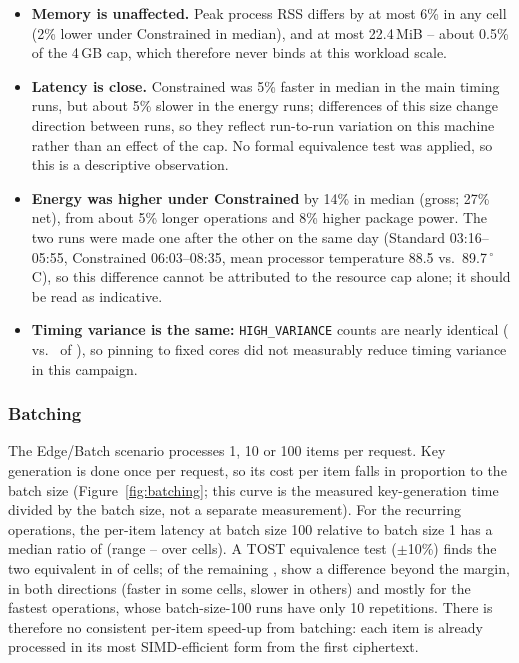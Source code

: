 \begin{itemize}[leftmargin=*, itemsep=2pt]
  \item \textbf{Memory is unaffected.} Peak process RSS differs by at most 6\% in any cell (2\% lower under Constrained in median), and at most 22.4\,MiB -- about 0.5\% of the 4\,GB cap, which therefore never binds at this workload scale.
  \item \textbf{Latency is close.} Constrained was 5\% faster in median in the main timing runs, but about 5\% slower in the energy runs; differences of this size change direction between runs, so they reflect run-to-run variation on this machine rather than an effect of the cap. No formal equivalence test was applied, so this is a descriptive observation.
  \item \textbf{Energy was higher under Constrained} by 14\% in median (gross; 27\% net), from about 5\% longer operations and 8\% higher package power. The two runs were made one after the other on the same day (Standard 03:16--05:55, Constrained 06:03--08:35, mean processor temperature 88.5 vs.\ 89.7\,$^\circ$C), so this difference cannot be attributed to the resource cap alone; it should be read as indicative.
  \item \textbf{Timing variance is the same:} \texttt{HIGH\_VARIANCE} counts are nearly identical (\hvStdCommon{} vs.\ \hvConCommon{} of \nCommon{}), so pinning to fixed cores did not measurably reduce timing variance in this campaign.
\end{itemize}

\subsubsection*{Batching}

The Edge/Batch scenario processes 1, 10 or 100 items per request. Key generation is done once per request, so its cost per item falls in proportion to the batch size (Figure~\ref{fig:batching}; this curve is the measured key-generation time divided by the batch size, not a separate measurement). For the recurring operations, the per-item latency at batch size 100 relative to batch size 1 has a median ratio of \batchRatioMedian{} (range \batchRatioMin--\batchRatioMax{} over \batchN{} cells). A TOST equivalence test ($\pm$10\%) finds the two equivalent in \batchEquiv{} of \batchN{} cells; of the remaining \batchNotEstablished, \batchRealDiff{} show a difference beyond the margin, in both directions (faster in some cells, slower in others) and mostly for the fastest operations, whose batch-size-100 runs have only 10 repetitions. There is therefore no consistent per-item speed-up from batching: each item is already processed in its most SIMD-efficient form from the first ciphertext.

